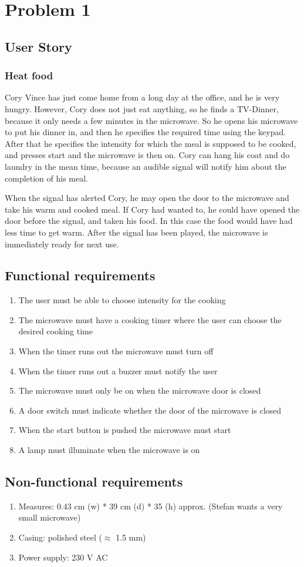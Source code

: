 \chapter{Problem 1}
\label{chp:intro}
\section{User Story}
\subsection{Heat food}
Cory Vince has just come home from a long day at the office, and he is very hungry. However, Cory does not just eat anything, so he finds a TV-Dinner, because it only needs a few minutes in the microwave. So he opens his microwave to put his dinner in, and then he specifies the required time using the keypad. After that he specifies the intensity for which the meal is supposed to be cooked, and presses start and the microwave is then on. Cory can hang his coat and do laundry in the mean time, because an audible signal will notify him about the completion of his meal.

When the signal has alerted Cory, he may open the door to the microwave and take his warm and cooked meal. If Cory had wanted to, he could have opened the door before the signal, and taken his food. In this case the food would have had less time to get warm. After the signal has been played, the microwave is immediately ready for next use.

\section{Functional requirements}
\begin{enumerate}[label=FR-\arabic*:]

\item The user must be able to choose intensity for the cooking
\item The microwave must have a cooking timer where the user can choose the desired cooking time
\item When the timer runs out the microwave must turn off
\item When the timer runs out a buzzer must notify the user
\item The microwave must only be on when the microwave door is closed
\item A door switch must indicate whether the door of the microwave is closed
\item When the start button is pushed the microwave must start
\item A lamp must illuminate when the microwave is on

\end{enumerate}

\section{Non-functional requirements}

\begin{enumerate}[label=NFR-\arabic*:]
 \item Measures: 0.43 cm (w) * 39 cm (d) * 35 (h) approx. (Stefan wants a very small microwave)
 \item Casing: polished steel ($\approx$ 1.5 mm)
 \item Power supply: 230 V AC
\end{enumerate}
